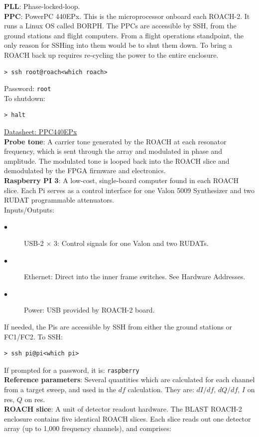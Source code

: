 \textbf{PLL}: Phase-locked-loop.\\
\textbf{PPC}: PowerPC 440EPx. This is the microprocessor onboard each ROACH-2. It runs a Linux OS called BORPH\@. The PPCs are accessible by SSH, from the ground stations and flight computers. From a flight operations standpoint, the only reason for SSHing into them would be to shut them down. To bring a ROACH back up requires re-cycling the power to the entire enclosure.
\begin{verbatim}
> ssh root@roach<which roach>
\end{verbatim}
Password: \texttt{root}\\
To shutdown:
\begin{verbatim}
> halt
\end{verbatim}
\href{http://c1170156.r56.cf3.rackcdn.com/UK_AMC_PPC440EPx-SUA400T_2DS.pdf}{Datasheet: PPC440EPx}\\
\textbf{Probe tone}: A carrier tone generated by the ROACH at each resonator frequency, which is sent through the array and modulated in phase and amplitude. The modulated tone is looped back into the ROACH slice and demodulated by the FPGA firmware and electronics.\\
\textbf{Raspberry PI 3}: A low-cost, single-board computer found in each ROACH slice. Each Pi serves as a control interface for one Valon 5009 Synthesizer and two RUDAT programmable attenuators.\\
Inputs/Outputs:
\begin{description}
  \item[$\bullet$] USB-2 $\times$ 3: Control signals for one Valon and two RUDATs.
  \item[$\bullet$] Ethernet: Direct into the inner frame switches. See Hardware Addresses.
  \item[$\bullet$] Power: USB provided by ROACH-2 board.
\end{description}
If needed, the Pis are accessible by SSH from either the ground stations or FC1/FC2. To SSH:\
\begin{verbatim}
> ssh pi@pi<which pi>
\end{verbatim}
If prompted for a password, it is: \texttt{raspberry}\\
\textbf{Reference parameters}: Several quantities which are calculated for each channel from a target sweep, and used in the $df$ calculation. They are: $dI/df$, $dQ/df$, $I$ on res, $Q$ on res.\\
\textbf{ROACH slice}: A unit of detector readout hardware. The BLAST ROACH-2 enclosure contains five identical ROACH slices. Each slice reads out one detector array (up to 1,000 frequency channels), and comprises:
